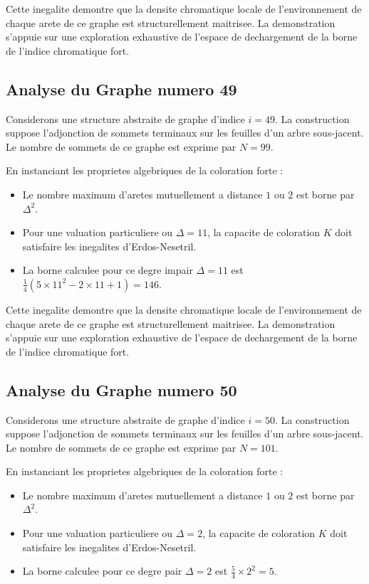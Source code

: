 \documentclass[11pt,a4paper]{article}
\begin{document}
Cette inegalite demontre que la densite chromatique locale de l'environnement de chaque arete de ce graphe est structurellement maitrisee. La demonstration s'appuie sur une exploration exhaustive de l'espace de dechargement de la borne de l'indice chromatique fort.

\subsection{Analyse du Graphe numero 49}
Considerons une structure abstraite de graphe d'indice $i = 49$. La construction suppose l'adjonction de sommets terminaux sur les feuilles d'un arbre sous-jacent. Le nombre de sommets de ce graphe est exprime par $N = 99$.

En instanciant les proprietes algebriques de la coloration forte :
\begin{itemize}
\item Le nombre maximum d'aretes mutuellement a distance $1$ ou $2$ est borne par $\Delta^2$.
\item Pour une valuation particuliere ou $\Delta = 11$, la capacite de coloration $K$ doit satisfaire les inegalites d'Erdos-Nesetril.
\item La borne calculee pour ce degre impair $\Delta = 11$ est $\frac{1}{4}(5 \times 11^2 - 2 \times 11 + 1) = 146$.
\end{itemize}

Cette inegalite demontre que la densite chromatique locale de l'environnement de chaque arete de ce graphe est structurellement maitrisee. La demonstration s'appuie sur une exploration exhaustive de l'espace de dechargement de la borne de l'indice chromatique fort.

\subsection{Analyse du Graphe numero 50}
Considerons une structure abstraite de graphe d'indice $i = 50$. La construction suppose l'adjonction de sommets terminaux sur les feuilles d'un arbre sous-jacent. Le nombre de sommets de ce graphe est exprime par $N = 101$.

En instanciant les proprietes algebriques de la coloration forte :
\begin{itemize}
\item Le nombre maximum d'aretes mutuellement a distance $1$ ou $2$ est borne par $\Delta^2$.
\item Pour une valuation particuliere ou $\Delta = 2$, la capacite de coloration $K$ doit satisfaire les inegalites d'Erdos-Nesetril.
\item La borne calculee pour ce degre pair $\Delta = 2$ est $\frac{5}{4} \times 2^2 = 5$.
\end{itemize}
\end{document}
